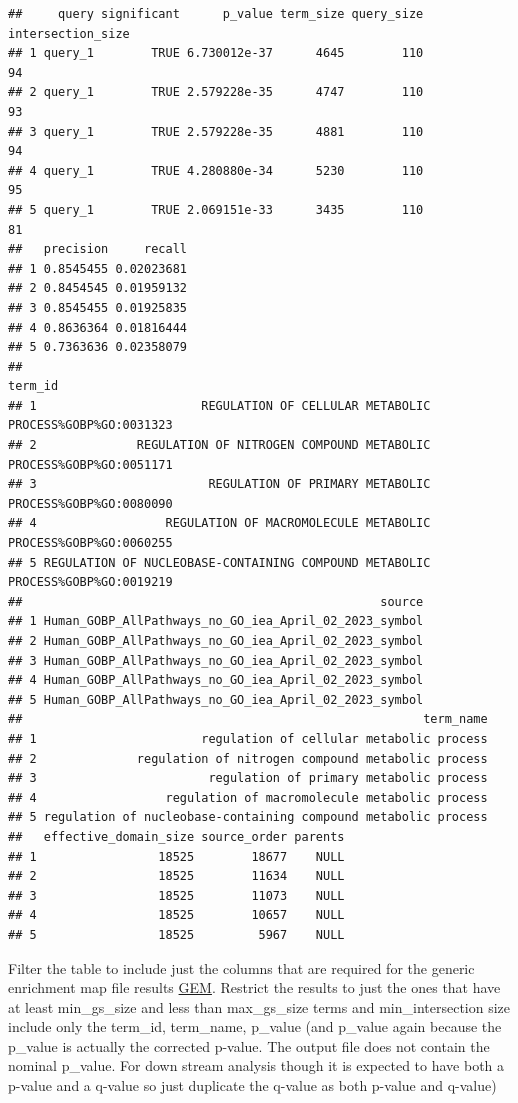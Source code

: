 \documentclass[
]{book}
\begin{document}
\begin{verbatim}
##     query significant      p_value term_size query_size intersection_size
## 1 query_1        TRUE 6.730012e-37      4645        110                94
## 2 query_1        TRUE 2.579228e-35      4747        110                93
## 3 query_1        TRUE 2.579228e-35      4881        110                94
## 4 query_1        TRUE 4.280880e-34      5230        110                95
## 5 query_1        TRUE 2.069151e-33      3435        110                81
##   precision     recall
## 1 0.8545455 0.02023681
## 2 0.8454545 0.01959132
## 3 0.8545455 0.01925835
## 4 0.8636364 0.01816444
## 5 0.7363636 0.02358079
##                                                                          term_id
## 1                       REGULATION OF CELLULAR METABOLIC PROCESS%GOBP%GO:0031323
## 2              REGULATION OF NITROGEN COMPOUND METABOLIC PROCESS%GOBP%GO:0051171
## 3                        REGULATION OF PRIMARY METABOLIC PROCESS%GOBP%GO:0080090
## 4                  REGULATION OF MACROMOLECULE METABOLIC PROCESS%GOBP%GO:0060255
## 5 REGULATION OF NUCLEOBASE-CONTAINING COMPOUND METABOLIC PROCESS%GOBP%GO:0019219
##                                                  source
## 1 Human_GOBP_AllPathways_no_GO_iea_April_02_2023_symbol
## 2 Human_GOBP_AllPathways_no_GO_iea_April_02_2023_symbol
## 3 Human_GOBP_AllPathways_no_GO_iea_April_02_2023_symbol
## 4 Human_GOBP_AllPathways_no_GO_iea_April_02_2023_symbol
## 5 Human_GOBP_AllPathways_no_GO_iea_April_02_2023_symbol
##                                                        term_name
## 1                       regulation of cellular metabolic process
## 2              regulation of nitrogen compound metabolic process
## 3                        regulation of primary metabolic process
## 4                  regulation of macromolecule metabolic process
## 5 regulation of nucleobase-containing compound metabolic process
##   effective_domain_size source_order parents
## 1                 18525        18677    NULL
## 2                 18525        11634    NULL
## 3                 18525        11073    NULL
## 4                 18525        10657    NULL
## 5                 18525         5967    NULL
\end{verbatim}

Filter the table to include just the columns that are required for the generic enrichment map file results \href{https://enrichmentmap.readthedocs.io/en/latest/FileFormats.html\#generic-results-files}{GEM}. Restrict the results to just the ones that have at least min\_gs\_size and less than max\_gs\_size terms and min\_intersection size include only the term\_id, term\_name, p\_value (and p\_value again because the p\_value is actually the corrected p-value. The output file does not contain the nominal p\_value. For down stream analysis though it is expected to have both a p-value and a q-value so just duplicate the q-value as both p-value and q-value)
\end{document}
